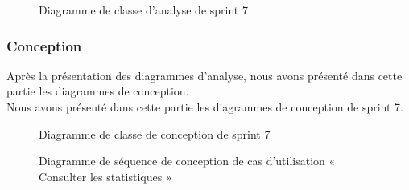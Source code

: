 \begin{figure}[H]
  \centering
  \caption{Diagramme de classe d'analyse de sprint 7}
  \label{fig:class_analyse_sprint7}
\end{figure}


\subsubsection{Conception}

Après la présentation des diagrammes d'analyse, nous avons présenté dans cette partie les diagrammes de conception.\\ 
Nous avons présenté dans cette partie les diagrammes de conception de sprint 7. \\
\begin{landscape}


\begin{figure}[H]
  \centering
  \caption{Diagramme de classe de conception de sprint 7}
  \label{fig:class_diagram_5}
\end{figure}
\end{landscape}


\begin{figure}[H]
  \centering
  \caption{Diagramme de séquence de conception de cas d'utilisation « Consulter les statistiques »}
  \label{fig:sequence_conception_consulter_statistiques}
\end{figure}


